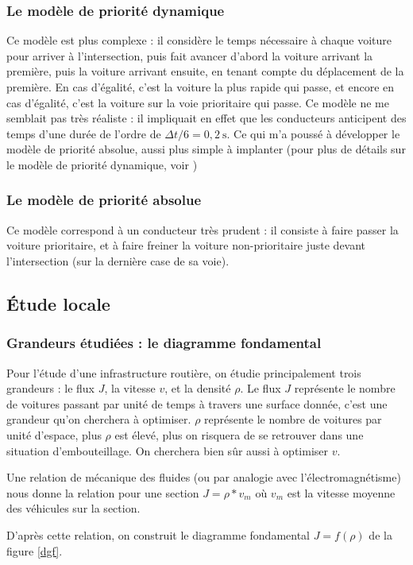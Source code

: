 \documentclass[11pt]{article}
\begin{document}
		\subsubsection{Le modèle de priorité dynamique}
		Ce modèle est plus complexe : il considère le temps nécessaire à chaque voiture pour arriver à l'intersection, puis fait avancer d'abord la voiture arrivant la première, puis la voiture arrivant ensuite, en tenant compte du déplacement de la première. En cas d'égalité, c'est la voiture la plus rapide qui passe, et encore en cas d'égalité, c'est la voiture sur la voie prioritaire qui passe. Ce modèle ne me semblait pas très réaliste : il impliquait en effet que les conducteurs anticipent des temps d'une durée de l'ordre de $\Delta	t / 6 = 0,2 ~\mathrm{s}$. Ce qui m'a poussé à développer le modèle de priorité absolue, aussi plus simple à implanter (pour plus de détails sur le modèle de priorité dynamique, voir \cite{ChPh})
		\subsubsection{Le modèle de priorité absolue}
		Ce modèle correspond à un conducteur très prudent : il consiste à faire passer la voiture prioritaire, et à faire freiner la voiture non-prioritaire juste devant l'intersection (sur la dernière case de sa voie).
		
	\subsection{Étude locale}	
		\subsubsection{Grandeurs étudiées : le diagramme fondamental}

Pour l'étude d'une infrastructure routière, on étudie principalement trois grandeurs : le flux $J$, la vitesse $v$, et la densité $\rho$. Le flux $J$ représente le nombre de voitures passant par unité de temps à travers une surface donnée, c'est une grandeur qu'on cherchera à optimiser. $\rho$ représente le nombre de voitures par unité d'espace, plus $\rho$ est élevé, plus on risquera de se retrouver dans une situation d'embouteillage. On cherchera bien sûr aussi à optimiser $v$. \par
Une relation de mécanique des fluides (ou par analogie avec l'électromagnétisme) nous donne la relation pour une section $J = \rho * v_m $ où $v_m$ est la vitesse moyenne des véhicules sur la section.\par 
D'après cette relation, on construit le diagramme fondamental $J=f(\rho)$ de la figure \ref{dgf}.
\end{document}
